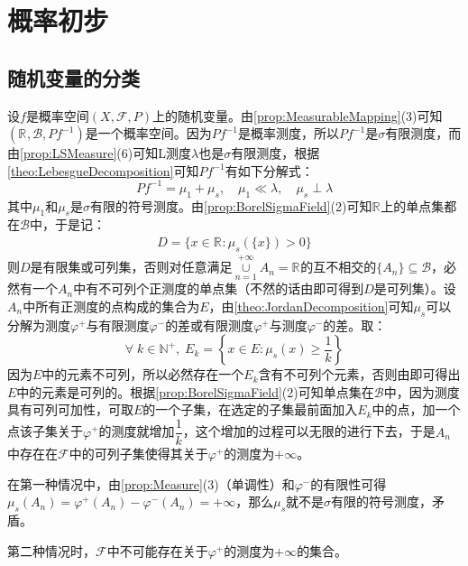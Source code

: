 \chapter{概率初步}

\section{随机变量的分类}
设$f$是概率空间$(X,\mathscr{F},P)$上的随机变量。由\cref{prop:MeasurableMapping}(3)可知$(\mathbb{R}^{},\mathcal{B},Pf^{-1})$是一个概率空间。因为$Pf^{-1}$是概率测度，所以$Pf^{-1}$是$\sigma$有限测度，而由\cref{prop:LSMeasure}(6)可知L测度$\lambda$也是$\sigma$有限测度，根据\cref{theo:LebesgueDecomposition}可知$Pf^{-1}$有如下分解式：
\begin{equation*}
	Pf^{-1}=\mu_1+\mu_s,\quad\mu_1\ll\lambda,\quad\mu_s\perp\lambda
\end{equation*}
其中$\mu_1$和$\mu_s$是$\sigma$有限的符号测度。由\cref{prop:BorelSigmaField}(2)可知$\mathbb{R}^{}$上的单点集都在$\mathcal{B}$中，于是记：
\begin{gather*}
	D=\{x\in\mathbb{R}^{}:\mu_s(\{x\})>0\}
\end{gather*}
则$D$是有限集或可列集，否则对任意满足$\underset{n=1}{\overset{+\infty}{\cup}}A_n=\mathbb{R}^{}$的互不相交的$\{A_n\}\subseteq\mathcal{B}$，必然有一个$A_n$中有不可列个正测度的单点集（不然的话由即可得到$D$是可列集）。设$A_n$中所有正测度的点构成的集合为$E$，由\cref{theo:JordanDecomposition}可知$\mu_s$可以分解为测度$\varphi^+$与有限测度$\varphi^-$的差或有限测度$\varphi^+$与测度$\varphi^-$的差。取：
\begin{equation*}
	\forall\;k\in\mathbb{N}^+,\;E_k=\left\{x\in E:\mu_s(x)\geqslant\frac{1}{k}\right\}
\end{equation*}
因为$E$中的元素不可列，所以必然存在一个$E_k$含有不可列个元素，否则由即可得出$E$中的元素是可列的。根据\cref{prop:BorelSigmaField}(2)可知单点集在$\mathcal{B}$中，因为测度具有可列可加性，可取$E$的一个子集，在选定的子集最前面加入$E_k$中的点，加一个点该子集关于$\varphi^+$的测度就增加$\dfrac{1}{k}$，这个增加的过程可以无限的进行下去，于是$A_n$中存在在$\mathscr{F}$中的可列子集使得其关于$\varphi^+$的测度为$+\infty$。\par
在第一种情况中，由\cref{prop:Measure}(3)（单调性）和$\varphi^-$的有限性可得$\mu_s(A_n)=\varphi^+(A_n)-\varphi^-(A_n)=+\infty$，那么$\mu_s$就不是$\sigma$有限的符号测度，矛盾。\par
第二种情况时，$\mathscr{F}$中不可能存在关于$\varphi^+$的测度为$+\infty$的集合。\par
